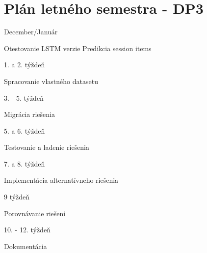 
\chapter{Plán letného semestra - DP3}


\begin{my_itemize}
	\item December/Január
	\begin{my_itemize}
		\myitem Otestovanie LSTM verzie
		\myitem Predikcia session items
	\end{my_itemize}
	
	\item 1. a 2. týždeň
	\begin{my_itemize}
		\myitem Spracovanie vlastného datasetu
	\end{my_itemize}


	\item 3. - 5. týždeň
	\begin{my_itemize}
		\myitem Migrácia riešenia
	\end{my_itemize}

	\item 5. a 6. týždeň
	\begin{my_itemize}
		\myitem Testovanie a ladenie riešenia
	\end{my_itemize}

	\item 7. a 8. týždeň
	\begin{my_itemize}
		\myitem Implementácia alternatívneho riešenia
	\end{my_itemize}

	\item 9 týždeň
	\begin{my_itemize}
		\myitem Porovnávanie riešení
	\end{my_itemize}

	\item 10. - 12. týždeň
	\begin{my_itemize}
		\myitem Dokumentácia
	\end{my_itemize}


\end{my_itemize}